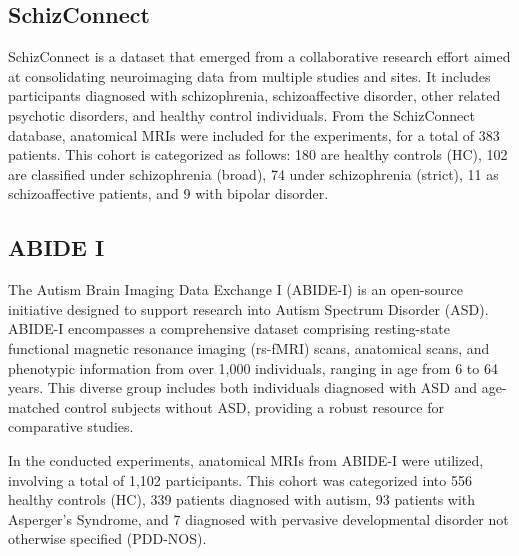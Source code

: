 \subsection{SchizConnect}
SchizConnect is a dataset that emerged from a collaborative research effort
aimed at consolidating neuroimaging data from multiple studies and sites. It
includes participants diagnosed with schizophrenia, schizoaffective disorder,
other related psychotic disorders, and healthy control individuals. From the
SchizConnect database, anatomical MRIs were included for the experiments, for a
total of 383 patients. This cohort is categorized as follows: 180 are healthy
controls (HC), 102 are classified under schizophrenia (broad), 74 under
schizophrenia (strict), 11 as schizoaffective patients, and 9 with bipolar
disorder.

\subsection{ABIDE I}
The Autism Brain Imaging Data Exchange I (ABIDE-I) is an open-source initiative
designed to support research into Autism Spectrum Disorder (ASD). ABIDE-I
encompasses a comprehensive dataset comprising resting-state functional magnetic
resonance imaging (rs-fMRI) scans, anatomical scans, and phenotypic information
from over 1,000 individuals, ranging in age from 6 to 64 years. This diverse
group includes both individuals diagnosed with ASD and age-matched control
subjects without ASD, providing a robust resource for comparative studies.

In the conducted experiments, anatomical MRIs from ABIDE-I were utilized,
involving a total of 1,102 participants. This cohort was categorized into 556
healthy controls (HC), 339 patients diagnosed with autism, 93 patients with
Asperger's Syndrome, and 7 diagnosed with pervasive developmental disorder not
otherwise specified (PDD-NOS). 


